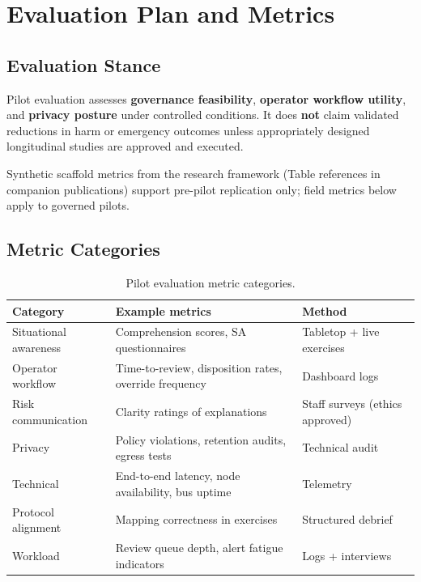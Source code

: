 \section{Evaluation Plan and Metrics}
\label{sec:evaluation-metrics}

\subsection{Evaluation Stance}

Pilot evaluation assesses \textbf{governance feasibility}, \textbf{operator workflow
utility}, and \textbf{privacy posture} under controlled conditions.
It does \textbf{not} claim validated reductions in harm or emergency outcomes unless
appropriately designed longitudinal studies are approved and executed.

Synthetic scaffold metrics from the research framework (Table references in companion
publications) support pre-pilot replication only; field metrics below apply to governed pilots.

\subsection{Metric Categories}

\begin{table}[htbp]
  \centering
  \caption{Pilot evaluation metric categories.}
  \label{tab:eval-metrics}
  \small
  \begin{tabular}{@{}p{3.0cm}p{4.4cm}p{4.6cm}@{}}
    \toprule
    Category & Example metrics & Method \\
    \midrule
    Situational awareness &
      Comprehension scores, SA questionnaires~\cite{endsley1995sa} &
      Tabletop + live exercises \\
    Operator workflow &
      Time-to-review, disposition rates, override frequency &
      Dashboard logs \\
    Risk communication &
      Clarity ratings of explanations &
      Staff surveys (ethics approved) \\
    Privacy &
      Policy violations, retention audits, egress tests &
      Technical audit \\
    Technical &
      End-to-end latency, node availability, bus uptime &
      Telemetry \\
    Protocol alignment &
      Mapping correctness in exercises &
      Structured debrief \\
    Workload &
      Review queue depth, alert fatigue indicators &
      Logs + interviews \\
    \bottomrule
  \end{tabular}
\end{table}


